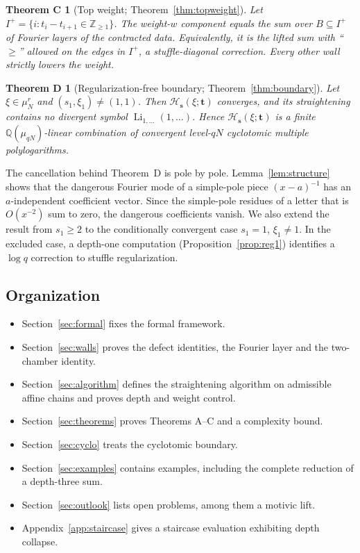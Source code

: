 \documentclass[11pt]{amsart}
\newtheorem*{theoremC}{Theorem C}
\newtheorem*{theoremD}{Theorem D}
\theoremstyle{definition}
\theoremstyle{remark}
\numberwithin{equation}{section}
\newcommand{\Z}{\mathbb{Z}}
\newcommand{\Q}{\mathbb{Q}}
\newcommand{\Li}{\operatorname{Li}}
\newcommand{\s}{\mathbf{s}}
\newcommand{\tb}{\mathbf{t}}
\newcommand{\Hs}{\mathcal{H}}
\begin{document}
\begin{theoremC}[Top weight; Theorem~\ref{thm:topweight}]
Let $I^+=\{i: t_i-t_{i+1}\in\Z_{\ge1}\}$. The weight-$w$ component equals the sum over $B\subseteq I^+$ of Fourier layers of the contracted data. Equivalently, it is the lifted sum with ``$\ge$'' allowed on the edges in $I^+$, a stuffle-diagonal correction. Every other wall strictly lowers the weight.
\end{theoremC}

\begin{theoremD}[Regularization-free boundary; Theorem~\ref{thm:boundary}]
Let $\xi\in\mu_N^r$ and $(s_1,\xi_1)\ne(1,1)$. Then $\Hs_\s(\xi;\tb)$ converges, and its straightening contains no divergent symbol $\Li_{1,\dots}(1,\dots)$. Hence $\Hs_\s(\xi;\tb)$ is a finite $\Q(\mu_{qN})$-linear combination of convergent level-$qN$ cyclotomic multiple polylogarithms.
\end{theoremD}

The cancellation behind Theorem~D is pole by pole. Lemma~\ref{lem:structure} shows that the dangerous Fourier mode of a simple-pole piece $(x-a)^{-1}$ has an $a$-independent coefficient vector. Since the simple-pole residues of a letter that is $O(x^{-2})$ sum to zero, the dangerous coefficients vanish. We also extend the result from $s_1\ge2$ to the conditionally convergent case $s_1=1$, $\xi_1\ne1$. In the excluded case, a depth-one computation (Proposition~\ref{prop:reg1}) identifies a $\log q$ correction to stuffle regularization.

\subsection*{Organization}
\begin{itemize}[leftmargin=1.5em]
\item Section~\ref{sec:formal} fixes the formal framework.
\item Section~\ref{sec:walls} proves the defect identities, the Fourier layer and the two-chamber identity.
\item Section~\ref{sec:algorithm} defines the straightening algorithm on admissible affine chains and proves depth and weight control.
\item Section~\ref{sec:theorems} proves Theorems A--C and a complexity bound.
\item Section~\ref{sec:cyclo} treats the cyclotomic boundary.
\item Section~\ref{sec:examples} contains examples, including the complete reduction of a depth-three sum.
\item Section~\ref{sec:outlook} lists open problems, among them a motivic lift.
\item Appendix~\ref{app:staircase} gives a staircase evaluation exhibiting depth collapse.
\end{itemize}
\end{document}
